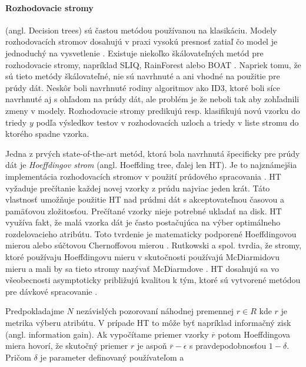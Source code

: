 \paragraph{Rozhodovacie stromy} (angl. Decision trees) sú častou metódou používanou na klasikáciu. Modely rozhodovacích stromov dosahujú v praxi vysokú presnosť zatiaľ čo model je jednoduchý na vysvetlenie \citep{jin2003efficient, hulten2001mining, domingos2000mining, aggarwal2014survey}. Existuje niekoľko škálovateľných metód pre rozhodovacie stromy, napríklad SLIQ, RainForest alebo BOAT \citep{aggarwal2014survey}. Napriek tomu, že sú tieto metódy škálovateľné, nie sú navrhnuté a ani vhodné na použitie pre prúdy dát. Neskôr boli navrhnuté rodiny algoritmov ako ID3, ktoré boli síce navrhnuté aj s ohľadom na prúdy dát, ale problém je že neboli tak aby  zohľadnili zmeny v modely. Rozhodovacie stromy predikujú resp. klasifikujú novú vzorku do triedy $y$ podľa výsledkov testov v rozhodovacích uzloch a triedy v liste stromu do ktorého spadne vzorka.
\par
Jedna z prvých state-of-the-art metód, ktorá bola navrhnutá špecificky pre prúdy dát je \textit{Hoeffdingov strom} (angl. Hoeffding tree, ďalej len HT).  Je to najznámejšia implementácia rozhodovacích stromov v použití prúdového spracovania \citep{domingos2000mining, aggarwal2014survey, nguyen2015survey}. HT vyžaduje prečítanie každej novej vzorky z prúdu najviac jeden krát. Táto vlastnosť umožňuje použitie HT nad prúdmi dát s akceptovateľnou časovou a pamäťovou zložitosťou. Prečítané vzorky nieje potrebné ukladať na disk. HT využíva fakt, že malá vzorka dát je často postačujúca na výber optimálneho rozdelovacieho atribútu. Toto tvrdenie je matematicky podporené Hoeffdingovou mierou alebo súčtovou Chernoffovou mierou \citep{domingos2000mining, han2011data}. Rutkowski a spol. tvrdia, že stromy, ktoré používaju Hoeffdingovu mieru v skutočnosti používajú McDiarmidovu mieru a mali by sa tieto stromy nazývať McDiarmdove \citep{rutkowski2013decision}. HT dosahujú sa vo všeobecnosti asymptoticky približujú kvalitou k tým, ktoré sú vytvorené metódou pre dávkové spracovanie \citep{hall2009weka}.
\par
Predpokladajme $N$ nezávislých pozorovaní náhodnej premennej $r \in R$ kde $r$ je metrika výberu atribútu. V prípade HT to môže byť napríklad informačný zisk (angl. information gain). Ak vypočítame priemer vzorky $\overline{r}$ potom Hoeffdingova miera hovorí, že skutočný priemer $r$ je aspoň $\overline{r}-\epsilon$ s pravdepodobnosťou $1-\delta$. Pričom $\delta$ je parameter definovaný používateľom a 

